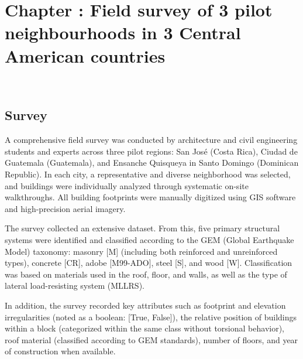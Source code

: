 \graphicspath{{figures_and_references/EELISA_conference/}}

\renewcommand{\chapternametext}{Chapter \thechapter: Field survey of 3 pilot neighbourhoods in 3 Central American countries}
\renewcommand{\shortchapternametext}{Chapter \thechapter: Field survey of 3 pilot neighbourhoods}

\chapter{\chapternametext}
\

\renewcommand{\headingtextL}{}
\renewcommand{\headingtextR}{\chapternametext}
\begingroup
 \flushbottom
 \setlength{\parskip}{0pt plus 1fil}%
 \localtableofcontents 
\endgroup


\newpage

\setcounter{section}{0} 



\FloatBarrier

\renewcommand{\sectionnametext}{Survey}
\renewcommand{\headingtextL}{\shortchapternametext}
\renewcommand{\headingtextR}{\thesection. \sectionnametext}
\section{\sectionnametext}


A comprehensive field survey was conducted by architecture and civil engineering students and experts across three pilot regions: San José (Costa Rica), Ciudad de Guatemala (Guatemala), and Ensanche Quisqueya in Santo Domingo (Dominican Republic). In each city, a representative and diverse neighborhood was selected, and buildings were individually analyzed through systematic on-site walkthroughs. All building footprints were manually digitized using GIS software and high-precision aerial imagery.


The survey collected an extensive dataset. From this, five primary structural systems were identified and classified according to the GEM (Global Earthquake Model) taxonomy: masonry [M] (including both reinforced and unreinforced types), concrete [CR], adobe [M99-ADO], steel [S], and wood [W]. Classification was based on materials used in the roof, floor, and walls, as well as the type of lateral load-resisting system (MLLRS).


In addition, the survey recorded key attributes such as footprint and elevation irregularities (noted as a boolean: [True, False]), the relative position of buildings within a block (categorized within the same class without torsional behavior), roof material (classified according to GEM standards), number of floors, and year of construction when available.

